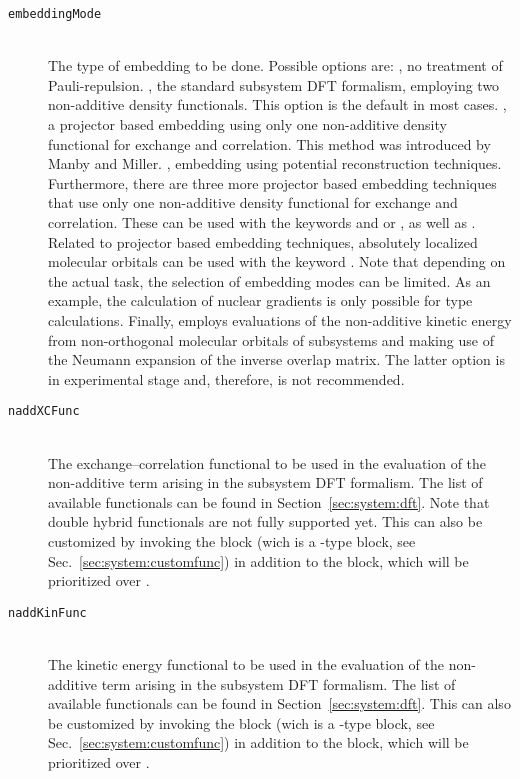 \begin{description}
  \item [\texttt{embeddingMode}]\hfill \\
    The type of embedding to be done. Possible options are:
    , no treatment of Pauli-repulsion.
    , the standard subsystem DFT formalism, employing two non-additive density functionals.
    This option is the default in most cases.
    , a projector based embedding using only one non-additive density functional for exchange
    and correlation. This method was introduced by Manby and Miller.
    , embedding using potential reconstruction techniques.
    Furthermore, there are three more projector based embedding techniques that use only one non-additive
    density functional for exchange and correlation. These can be used with the keywords  and
     or , as well as .
    Related to projector based embedding techniques, absolutely localized molecular orbitals can be used with
    the keyword .
    Note that depending on the actual task, the selection of embedding modes can be limited. As an example,
    the calculation of nuclear gradients is only possible for  type calculations. Finally,  employs evaluations of the non-additive kinetic energy from non-orthogonal molecular orbitals of subsystems and making use of the Neumann expansion of the inverse overlap matrix. The latter option is in experimental stage and, therefore, is not recommended.
  \item [\texttt{naddXCFunc}]\hfill \\
    The exchange--correlation functional to be used in the evaluation of the non-additive term arising in the
    subsystem DFT formalism. The list of available functionals can be found in Section~\ref{sec:system:dft}.
    Note that double hybrid functionals are not fully supported yet. This can also be customized by invoking the  block (wich is a -type block, see Sec.~\ref{sec:system:customfunc}) in addition to the  block, which will be prioritized over .
  \item [\texttt{naddKinFunc}]\hfill \\
    The kinetic energy functional to be used in the evaluation of the non-additive term arising in the
    subsystem DFT formalism. The list of available functionals can be found in Section~\ref{sec:system:dft}. This can also be customized by invoking the  block (wich is a -type block, see Sec.~\ref{sec:system:customfunc}) in addition to the  block, which will be prioritized over .

\end{description}
